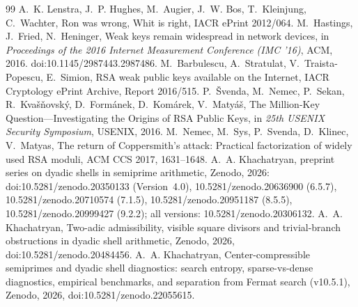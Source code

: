 \documentclass[11pt,a4paper]{article}
\begin{document}
\begin{thebibliography}{99}
 A.~K. Lenstra, J.~P. Hughes, M.~Augier, J.~W. Bos, T.~Kleinjung, C.~Wachter, Ron was wrong, Whit is right, IACR ePrint 2012/064.
 M.~Hastings, J.~Fried, N.~Heninger, Weak keys remain widespread in network devices, in \emph{Proceedings of the 2016 Internet Measurement Conference (IMC '16)}, ACM, 2016. doi:10.1145/2987443.2987486.
 M.~Barbulescu, A.~Stratulat, V.~Traista-Popescu, E.~Simion, RSA weak public keys available on the Internet, IACR Cryptology ePrint Archive, Report 2016/515.
 P.~\v{S}venda, M.~Nemec, P.~Sekan, R.~Kva\v{s}\v{n}ovsk\'y, D.~Form\'anek, D.~Kom\'arek, V.~Maty\'a\v{s}, The Million-Key Question---Investigating the Origins of RSA Public Keys, in \emph{25th USENIX Security Symposium}, USENIX, 2016.
 M.~Nemec, M.~Sys, P.~Svenda, D.~Klinec, V.~Matyas, The return of Coppersmith's attack: Practical factorization of widely used RSA moduli, ACM CCS 2017, 1631--1648.
 A.~A. Khachatryan, preprint series on dyadic shells in semiprime arithmetic, Zenodo, 2026: doi:10.5281/zenodo.20350133 (Version~4.0), 10.5281/zenodo.20636900 (6.5.7), 10.5281/zenodo.20710574 (7.1.5), 10.5281/zenodo.20951187 (8.5.5), 10.5281/zenodo.20999427 (9.2.2); all versions: 10.5281/zenodo.20306132.
 A.~A. Khachatryan, Two-adic admissibility, visible square divisors and trivial-branch obstructions in dyadic shell arithmetic, Zenodo, 2026, doi:10.5281/zenodo.20484456.
 A.~A. Khachatryan, Center-compressible semiprimes and dyadic shell diagnostics: search entropy, sparse-vs-dense diagnostics, empirical benchmarks, and separation from Fermat search (v10.5.1), Zenodo, 2026, doi:10.5281/zenodo.22055615.
\end{thebibliography}
\end{document}
